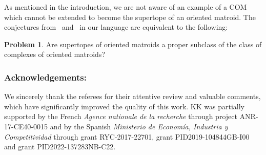 \documentclass[12pt]{amsart}
\theoremstyle{plain}
\numberwithin{Lemma}{\DefaultNumberTheoremWithin}
\numberwithin{Claim}{\DefaultNumberTheoremWithin}
\numberwithin{Theorem}{\DefaultNumberTheoremWithin}
\numberwithin{Corollary}{\DefaultNumberTheoremWithin}
\numberwithin{Proposition}{\DefaultNumberTheoremWithin}
\numberwithin{Conjecture}{\DefaultNumberTheoremWithin}
\numberwithin{Situation}{\DefaultNumberTheoremWithin}
\numberwithin{Note}{\DefaultNumberTheoremWithin}
\theoremstyle{definition}
\numberwithin{Definition}{\DefaultNumberTheoremWithin}
\theoremstyle{definition}
\numberwithin{Question}{\DefaultNumberTheoremWithin}
\theoremstyle{definition}
\newtheorem{Problem}{Problem}
\numberwithin{Problem}{\DefaultNumberTheoremWithin}
\theoremstyle{remark} \newtheorem{Remark}{Remark}
\numberwithin{Remark}{\DefaultNumberTheoremWithin}
\theoremstyle{remark}
\numberwithin{Example}{\DefaultNumberTheoremWithin}
\numberwithin{Case}{Lemma}
\numberwithin{Step}{Lemma}
\begin{document}
As mentioned in the introduction, we are not aware of
  an example of a COM which cannot be extended to become the supertope
  of an oriented matroid. The conjectures 
  from~\cite[Conjecture 1]{BCK} and~\cite[Conjecture 1]{KM} in our
  language are equivalent to the following:

\begin{Problem}\label{prob:supertopes}
  Are supertopes of oriented matroids a proper subclass of the class of complexes of oriented matroids?
\end{Problem}


\subsubsection*{Acknowledgements:} We sincerely thank the referees for their attentive review and valuable comments, which have significantly improved the quality of this work. KK was partially supported by the French \emph{Agence nationale de la recherche} through project ANR-17-CE40-0015 and by the Spanish \emph{Ministerio de Econom\'ia, Industria y Competitividad}
through grant RYC-2017-22701, grant PID2019-104844GB-I00 and grant PID2022-137283NB-C22. 
\end{document}
